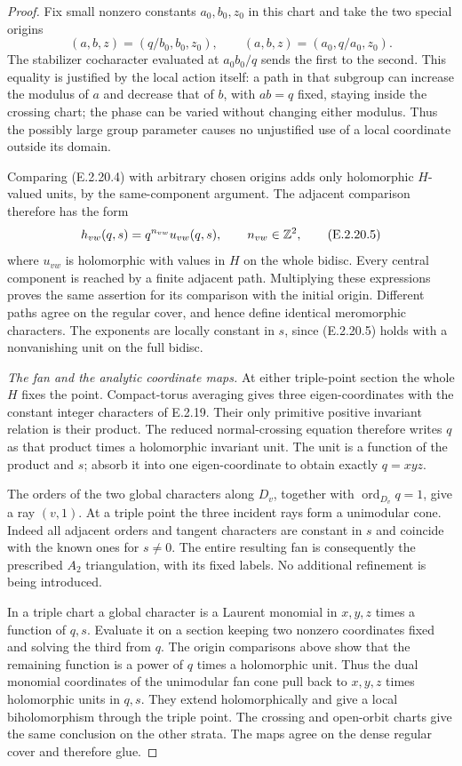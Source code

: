 \begin{proof}
Fix small nonzero constants
$a_0,b_0,z_0$ in this chart
and take the two special
origins
\[
 (a,b,z)=(q/b_0,b_0,z_0),\qquad
 (a,b,z)=(a_0,q/a_0,z_0).
 \tag{E.2.20.4}
\]
The stabilizer cocharacter
evaluated at $a_0b_0/q$
sends the first to the
second.  This equality
is justified by the local
action itself: a path
in that subgroup can
increase the modulus of
$a$ and decrease that
of $b$, with $ab=q$
fixed, staying inside
the crossing chart;
the phase can be varied
without changing either
modulus.  Thus the
possibly large group
parameter causes no
unjustified use of a
local coordinate outside
its domain.

Comparing (E.2.20.4) with
arbitrary chosen origins
adds only holomorphic
$H$-valued units, by the
same-component argument.
The adjacent comparison
therefore has the form
\[
 h_{vw}(q,s)=q^{n_{vw}}u_{vw}(q,s),
 \qquad n_{vw}\in\mathbb Z^2,
 \tag{E.2.20.5}
\]
where $u_{vw}$ is holomorphic
with values in $H$ on the
whole bidisc.  Every central
component is reached by
a finite adjacent path.
Multiplying these expressions
proves the same assertion
for its comparison with
the initial origin.
Different paths agree
on the regular cover,
and hence define identical
meromorphic characters.
The exponents are locally
constant in $s$, since
(E.2.20.5) holds with a
nonvanishing unit on the
full bidisc.

\emph{The fan and the analytic coordinate maps.}
At either triple-point
section the whole $H$
fixes the point.
Compact-torus averaging
gives three eigen-coordinates
with the constant integer
characters of E.2.19.
Their only primitive
positive invariant relation
is their product.
The reduced normal-crossing
equation therefore writes
$q$ as that product times
a holomorphic invariant
unit.  The unit is a
function of the product
and $s$; absorb it into
one eigen-coordinate to
obtain exactly $q=xyz$.

The orders of the two
global characters along
$D_v$, together with
$\operatorname{ord}_{D_v}q=1$,
give a ray $(v,1)$.
At a triple point the
three incident rays
form a unimodular cone.
Indeed all adjacent
orders and tangent
characters are constant
in $s$ and coincide
with the known ones
for $s\ne0$.
The entire resulting
fan is consequently
the prescribed $A_2$
triangulation, with
its fixed labels.
No additional refinement
is being introduced.

In a triple chart a
global character is
a Laurent monomial in
$x,y,z$ times a function
of $q,s$.  Evaluate it
on a section keeping
two nonzero coordinates
fixed and solving the
third from $q$.
The origin comparisons
above show that the
remaining function is
a power of $q$ times
a holomorphic unit.
Thus the dual monomial
coordinates of the
unimodular fan cone
pull back to $x,y,z$
times holomorphic units
in $q,s$.  They extend
holomorphically and
give a local
biholomorphism through
the triple point.
The crossing and
open-orbit charts give
the same conclusion
on the other strata.
The maps agree on
the dense regular
cover and therefore
glue.


\end{proof}
